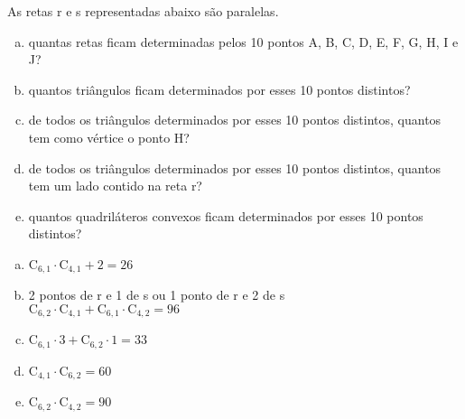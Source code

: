 \begin{ex}
As retas r e s representadas abaixo são paralelas.
\begin{center}
\end{center}
   \begin{enumerate}[(a)]
   \item quantas retas ficam determinadas pelos 10 pontos A, B, C, D, E, F, G, H, I e J?
   \item quantos triângulos ficam determinados por esses 10 pontos distintos?   
   \item de todos os triângulos determinados por esses 10 pontos distintos, quantos tem como vértice o ponto H?
   \item de todos os triângulos determinados por esses 10 pontos distintos, quantos tem um lado contido na reta r?
   \item quantos quadriláteros convexos ficam determinados por esses 10 pontos distintos?
   \end{enumerate}
     \begin{sol}
        \phantom{A}
        \begin{enumerate} [(a)]
            \item $\mathrm{C}_{6,1}\cdot\mathrm{C}_{4,1}+2= 26$
            \item 2 pontos de r e 1 de s ou 1 ponto de r e 2 de s \\
            $\mathrm{C}_{6,2}\cdot \mathrm{C}_{4,1}+\mathrm{C}_{6,1}\cdot\mathrm{C}_{4,2}=96$
            \item $\mathrm{C}_{6,1}\cdot3+\mathrm{C}_{6,2}\cdot1=33$
            \item $\mathrm{C}_{4,1}\cdot\mathrm{C}_{6,2}=60$
            \item $\mathrm{C}_{6,2}\cdot\mathrm{C}_{4,2}=90$
        \end{enumerate}
     \end{sol}
\end{ex}